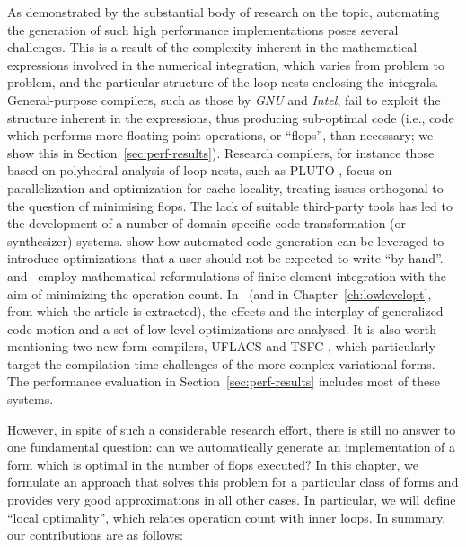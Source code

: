 As demonstrated by the substantial body of research on the topic, automating the generation of such high performance implementations poses several challenges. This is a result of the complexity inherent in the mathematical expressions involved in the numerical integration, which varies from problem to problem, and the particular structure of the loop nests enclosing the integrals. General-purpose compilers, such as those by \emph{GNU} and \emph{Intel}, fail to exploit the structure inherent in the expressions, thus producing sub-optimal code (i.e., code which performs more floating-point operations, or ``flops'', than necessary; we show this in Section~\ref{sec:perf-results}). Research compilers, for instance those based on polyhedral analysis of loop nests, such as PLUTO \citep{pluto}, focus on parallelization and optimization for cache locality, treating issues orthogonal to the question of minimising flops. The lack of suitable third-party tools has led to the development of a number of domain-specific code transformation (or synthesizer) systems. \cite{quadrature-olegaard} show how automated code generation can be leveraged to introduce optimizations that a user should not be expected to write ``by hand''. \cite{FFC-TC} and~\cite{Francis} employ mathematical reformulations of finite element integration with the aim of minimizing the operation count. In~\cite{Luporini-coffee} (and in Chapter~\ref{ch:lowlevelopt}, from which the article is extracted), the effects and the interplay of generalized code motion and a set of low level optimizations are analysed. It is also worth mentioning two new form compilers, UFLACS \citep{Uflacs} and TSFC \citep{TSFC}, which particularly target the compilation time challenges of the more complex variational forms. The performance evaluation in Section~\ref{sec:perf-results} includes most of these systems.

However, in spite of such a considerable research effort, there is still no answer to one fundamental question: can we automatically generate an implementation of a form which is optimal in the number of flops executed? In this chapter, we formulate an approach that solves this problem for a particular class of forms and provides very good approximations in all other cases. In particular, we will define ``local optimality'', which relates operation count with inner loops. In summary, our contributions are as follows:

